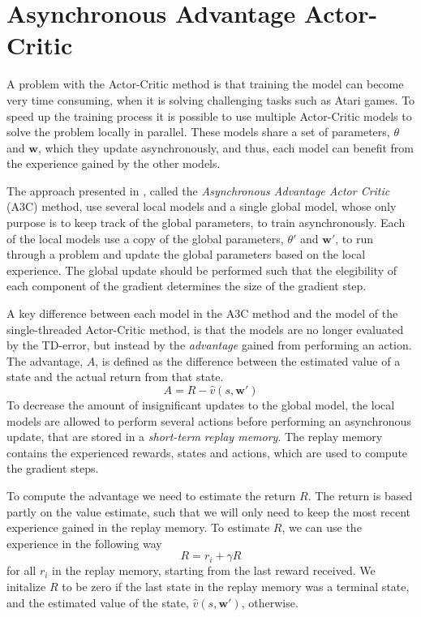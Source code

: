 \documentclass[11pt]{article}
\begin{document}

\section{Asynchronous Advantage Actor-Critic}\label{sec:a3c}

A problem with the Actor-Critic method is that training the model can become very time consuming,
when it is solving challenging tasks such as Atari games.
To speed up the training process it is possible to use 
multiple Actor-Critic models to 
solve the problem locally in parallel.
These models share a set of parameters, $\theta$ and $\mathbf{w}$, which they update asynchronously,
and thus, each model can benefit from the experience gained by the other models.

The approach presented in \cite{a3c}, called the \textit{Asynchronous Advantage Actor Critic} (A3C) method,
use several local models and a single global model, whose only purpose is to keep track of the global parameters,
to train asynchronously.
Each of the local models use a copy of the global parameters, $\theta'$ and $\mathbf{w}'$, to run through a problem
and update the global parameters based on the local experience.
The global update should be performed such that
the elegibility of each component of the gradient determines the size of the
gradient step.

A key difference between each model in the A3C method and the model of the single-threaded Actor-Critic method,
is that the models are no longer evaluated by the TD-error,
but instead by the \textit{advantage} gained from performing an action.
The advantage, $A$, is defined as the difference between the estimated value of
a state and the actual return from that state.
\begin{equation}
    A = R - \hat{v}(s, \mathbf{w}')
\end{equation}
To decrease the amount of insignificant updates to the global
model, the local models are allowed to perform several actions
before performing an asynchronous update, that are stored in a \textit{short-term
replay memory}.
The replay memory contains the experienced rewards, states and actions,
which are used to compute the gradient steps.

To compute the advantage we need to estimate the return $R$.
The return is based partly on the value estimate, such that we will only
need to keep the most recent experience gained in the replay memory.
To estimate $R$, we can use the experience in the following way
\begin{equation}
    R = r_i + \gamma R
\end{equation}
for all $r_i$ in the replay memory, starting from the last reward received.
We initalize $R$ to be zero if the last state in the replay memory was a terminal state,
and the estimated value of the state, $\hat{v}(s, \mathbf{w}')$, otherwise.
\end{document}
